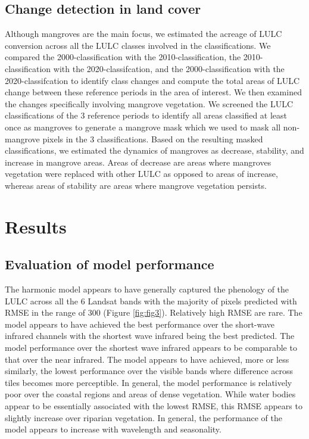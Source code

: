 \documentclass[12pt,oneside,preprint,3p,authoryear,times]{elsarticle} %
\begin{document}
\hypertarget{change-detection-in-land-cover}{%
\subsection{Change detection in land
cover}\label{change-detection-in-land-cover}}

Although mangroves are the main focus, we estimated the acreage of LULC
conversion across all the LULC classes involved in the classifications.
We compared the 2000-classification with the 2010-classification, the
2010-classification with the 2020-classifcation, and the
2000-classification with the 2020-classifcation to identify class
changes and compute the total areas of LULC change between these
reference periods in the area of interest. We then examined the changes
specifically involving mangrove vegetation. We screened the LULC
classifications of the 3 reference periods to identify all areas
classified at least once as mangroves to generate a mangrove mask which
we used to mask all non-mangrove pixels in the 3 classifications. Based
on the resulting masked classifications, we estimated the dynamics of
mangroves as decrease, stability, and increase in mangrove areas. Areas
of decrease are areas where mangroves vegetation were replaced with
other LULC as opposed to areas of increase, whereas areas of stability
are areas where mangrove vegetation persists.

\hypertarget{results}{%
\section{Results}\label{results}}

\hypertarget{evaluation-of-model-performance}{%
\subsection{Evaluation of model
performance}\label{evaluation-of-model-performance}}

The harmonic model appears to have generally captured the phenology of
the LULC across all the 6 Landsat bands with the majority of pixels
predicted with RMSE in the range of 300 (Figure \ref{fig:fig3}).
Relatively high RMSE are rare. The model appears to have achieved the
best performance over the short-wave infrared channels with the shortest
wave infrared being the best predicted. The model performance over the
shortest wave infrared appears to be comparable to that over the near
infrared. The model appears to have achieved, more or less similarly,
the lowest performance over the visible bands where difference across
tiles becomes more perceptible. In general, the model performance is
relatively poor over the coastal regions and areas of dense vegetation.
While water bodies appear to be essentially associated with the lowest
RMSE, this RMSE appears to slightly increase over riparian vegetation.
In general, the performance of the model appears to increase with
wavelength and seasonality.
\end{document}
